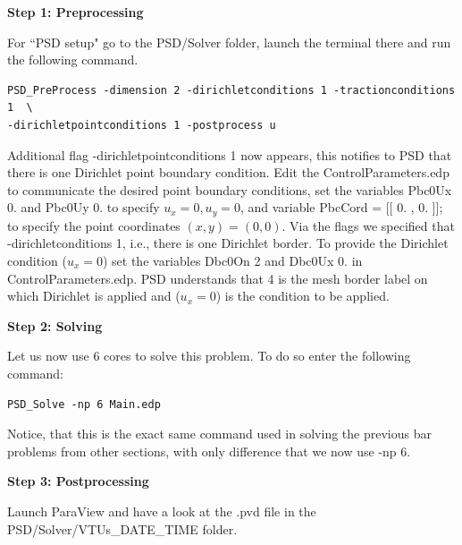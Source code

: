 \documentclass{report}
\begin{document}
\textbf{Step 1: Preprocessing}

For ``PSD setup" go to the {\ttfamily PSD/Solver} folder, launch the terminal there and run the following command.
\begin{lstlisting}[style=Linux]
PSD_PreProcess -dimension 2 -dirichletconditions 1 -tractionconditions 1  \ 
-dirichletpointconditions 1 -postprocess u
\end{lstlisting}

Additional flag {\ttfamily -dirichletpointconditions 1} now appears, this notifies to PSD that there is one Dirichlet point boundary condition. Edit the  {\ttfamily ControlParameters.edp} to communicate the desired point boundary conditions, set the variables {\ttfamily Pbc0Ux  0.} and {\ttfamily Pbc0Uy  0.} to specify $u_x=0,u_y=0$, and variable {\ttfamily PbcCord = [[  0. , 0. ]];} to specify the point coordinates $(x,y)=(0,0)$. Via the flags we specified that {\ttfamily -dirichletconditions 1}, i.e., there is one Dirichlet border.
To provide the Dirichlet condition ($u_x=0$) set the variables {\ttfamily Dbc0On 2} and {\ttfamily Dbc0Ux 0.}  in {\ttfamily ControlParameters.edp}. PSD understands that 4 is the mesh border label on which Dirichlet is applied and ($u_x=0$) is the condition to be applied.

\textbf{Step 2: Solving}

Let us now use 6 cores to solve this problem. To do so enter the following command:

\begin{lstlisting}[style=Linux]
PSD_Solve -np 6 Main.edp
\end{lstlisting}
%
Notice, that this is the exact same command used in solving the previous bar problems from other sections, with only difference that we now use {\ttfamily -np 6}.


\textbf{Step 3: Postprocessing}

Launch ParaView and have a look at the  {\ttfamily .pvd} file in the  {\ttfamily PSD/Solver/VTUs\_DATE\_TIME} folder. 
\end{document}

